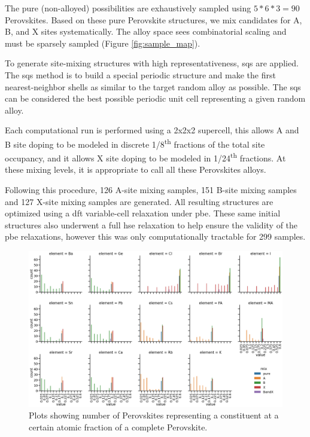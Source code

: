 \documentclass[twoside, twocolumn, 9pt, draft]{article}
\begin{document}
The pure (non-alloyed) possibilities are exhaustively sampled using
\(5*6*3 = 90\) Perovskites. Based on these pure Perovskite structures,
we mix candidates for A, B, and X sites systematically. The alloy
space sees combinatorial scaling and must be sparsely sampled (Figure
\ref{fig:sample_map}).

To generate site-mixing structures with high representativeness,
\acrfull{sqs}\cite{jiang-2016-special-quasir}
are applied. The \acrshort{sqs} method is to build a special periodic structure
and make the first nearest-neighbor shells as similar to the target
random alloy as possible. The \acrshort{sqs} can be considered the best possible
periodic unit cell representing a given random alloy.

Each computational run is performed using a 2x2x2 supercell, this
allows A and B site doping to be modeled in discrete 1/8\textsuperscript{th} fractions
of the total site occupancy, and it allows X site doping to be modeled
in 1/24\textsuperscript{th} fractions. At these mixing levels, it is appropriate to
call all these Perovskites alloys.

Following this procedure, 126 A-site mixing samples, 151 B-site
mixing samples and 127 X-site mixing samples are generated. All
resulting structures are optimized using a \acrshort{dft} variable-cell
relaxation under \acrfull{pbe}. These same initial structures also underwent a
full \acrfull{hse} relaxation to help ensure the validity of the \acrshort{pbe}
relaxations, however this was only computationally tractable for 299
samples.

\begin{figure}
\centering
\includegraphics[width=.9\linewidth]{./domains/variability_of_composition_vectors.png}
\caption{\label{fig:chemspace_uni} Plots showing number of Perovskites representing a constituent at a certain atomic fraction of a complete Perovskite.}
\end{figure}
\end{document}
